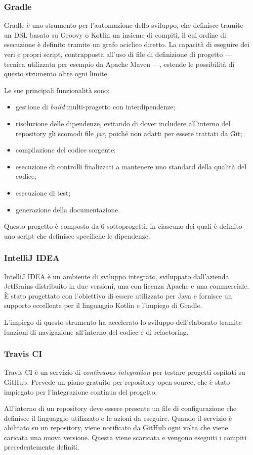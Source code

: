 \subsubsection{Gradle}
Gradle è uno strumento per l'automazione dello sviluppo, che definisce tramite
un DSL basato su Groovy o Kotlin un insieme di compiti, il cui ordine di
esecuzione è definito tramite un grafo aciclico diretto. La capacità di eseguire
dei veri e propri script, contrapposta all'uso di file di definizione di
progetto --- tecnica utilizzata per esempio da Apache Maven ---, estende le
possibilità di questo strumento oltre ogni limite.

Le sue principali funzionalità sono:

\begin{itemize}
\item{gestione di \textit{build} multi-progetto con interdipendenze;}
\item{risoluzione delle dipendenze, evitando di dover includere all'interno del
    repository gli scomodi file \textit{jar}, poiché non adatti per essere
    trattati da Git;}
\item{compilazione del codice sorgente;}
\item{esecuzione di controlli finalizzati a mantenere uno standard della qualità
    del codice;}
\item{esecuzione di test;}
\item{generazione della documentazione.}
\end{itemize}

Questo progetto è composto da 6 sottoprogetti, in ciascuno dei quali è definito
uno script che definisce specifiche le dipendenze.

\subsubsection{IntelliJ IDEA}

IntelliJ IDEA è un ambiente di sviluppo integrato, sviluppato dall'azienda
JetBrains distribuito in due versioni, una con licenza Apache e una commerciale.
È stato progettato con l'obiettivo di essere utilizzato per Java e fornisce un
supporto eccellente per il linguaggio Kotlin e l'impiego di Gradle.

L'impiego di questo strumento ha accelerato lo sviluppo dell'elaborato tramite
funzioni di navigazione all'interno del codice e di refactoring.

\subsubsection{Travis CI}
Travis CI è un servizio di \textit{continuous integration} per testare progetti
ospitati su GitHub. Prevede un piano gratuito per repository open-source, che è
stato impiegato per l'integrazione continua del progetto.

All'interno di un repository deve essere presente un file di configurazione che
definisce il linguaggio utilizzato e le azioni da eseguire. Quando il servizio è
abilitato su un repository, viene notificato da GitHub ogni volta che viene
caricata una nuova versione. Questa viene scaricata e vengono eseguiti i compiti
precedentemente definiti.
